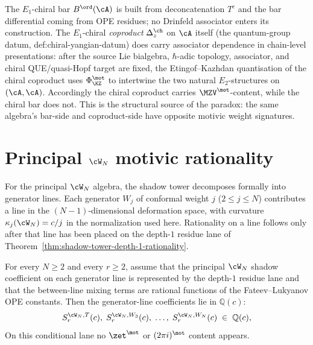 \begin{remark}
The $E_1$-chiral bar $B^{\ord}(\cA)$ is built from deconcatenation
$T^c$ and the bar differential coming from OPE residues; no
Drinfeld associator enters its construction. The $E_1$-chiral
\emph{coproduct} $\Delta^{\ch}_z$ on $\cA$ itself (the quantum-group
datum, def:chiral-yangian-datum) does carry associator dependence in
chain-level presentations: after the source Lie bialgebra,
\(\hbar\)-adic topology, associator, and chiral QUE/quasi-Hopf target
are fixed, the Etingof--Kazhdan quantisation of the chiral coproduct
uses $\Phi_{\KZ}^{\mot}$ to intertwine the two natural
$E_2$-structures on $(\cA, \cA)$. Accordingly the chiral
coproduct carries $\MZV^{\mot}$-content, while the chiral bar does
not. This is the structural source of the paradox: the same
algebra's bar-side and coproduct-side have opposite motivic
weight signatures.
\end{remark}

\section{Principal $\cW_N$ motivic rationality}
\label{sec:wn-motivic-rationality}

For the principal $\cW_N$ algebra, the shadow tower decomposes
formally into generator lines. Each generator $W_j$ of conformal
weight $j$ ($2 \leq j \leq N$) contributes a line in the
$(N-1)$-dimensional deformation space, with curvature
$\kappa_j(\cW_N) = c/j$ in the normalization used here. Rationality on a line follows only
after that line has been placed on the depth-$1$ residue lane of
Theorem~\ref{thm:shadow-tower-depth-1-rationality}.

\begin{theorem}
\ClaimStatusConditional
For every $N \geq 2$ and every $r \geq 2$, assume that the principal
$\cW_N$ shadow coefficient on each generator line is represented by
the depth-$1$ residue lane and that the between-line mixing terms are
rational functions of the Fateev--Lukyanov OPE constants. Then the
generator-line coefficients lie in
$\mathbb{Q}(c)$:
\[
 S_r^{\cW_N, T}(c), \; S_r^{\cW_N, W_3}(c), \; \ldots, \;
 S_r^{\cW_N, W_N}(c) \;\in\; \mathbb{Q}(c),
\]
On this conditional lane no $\zet^{\mot}$ or $(2\pi i)^{\mot}$
content appears.
\end{theorem}

